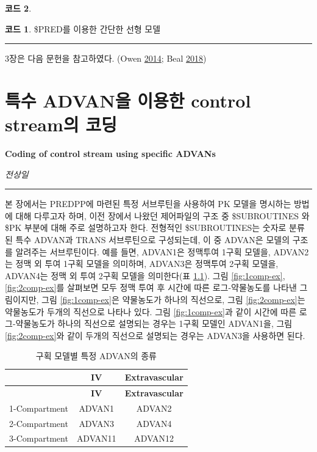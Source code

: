 \documentclass[
  10pt,
  krantz2,
  a4paper]{krantz}
\theoremstyle{definition}
\theoremstyle{definition}
\newtheorem{example}{코드}[chapter]
\theoremstyle{definition}
\theoremstyle{remark}
\begin{document}
\begin{example}
\begin{example}

\protect\hypertarget{exm:linear-model}{}{\label{exm:linear-model} }\$PRED를 이용한 간단한 선형 모델

\end{example}
\end{example}

\begin{center}\rule{0.5\linewidth}{0.5pt}\end{center}

3장은 다음 문헌을 참고하였다. (Owen \protect\hyperlink{ref-kelly}{2014}; Beal \protect\hyperlink{ref-nonmem}{2018})

\hypertarget{specific-advan}{%
\chapter{특수 ADVAN을 이용한 control stream의 코딩}\label{specific-advan}}

\textbf{Coding of control stream using specific ADVANs}

\emph{전상일}

\begin{center}\rule{0.5\linewidth}{0.5pt}\end{center}

본 장에서는 PREDPP에 마련된 특정 서브루틴을 사용하여 PK 모델을 명시하는 방법에 대해 다루고자 하며, 이전 장에서 나왔던 제어파일의 구조 중 \$SUBROUTINES 와 \$PK 부분에 대해 주로 설명하고자 한다. 전형적인 \$SUBROUTINES는 숫자로 분류된 특수 ADVAN과 TRANS 서브루틴으로 구성되는데, 이 중 ADVAN은 모델의 구조를 알려주는 서브루틴이다. 예를 들면, ADVAN1은 정맥투여 1구획 모델을, ADVAN2는 정맥 외 투여 1구획 모델을 의미하며, ADVAN3은 정맥투여 2구획 모델을, ADVAN4는 정맥 외 투여 2구획 모델을 의미한다(표 \ref{tab:specific-advan}). 그림 \ref{fig:1comp-ex}, \ref{fig:2comp-ex}를 살펴보면 모두 정맥 투여 후 시간에 따른 로그-약물농도를 나타낸 그림이지만, 그림 \ref{fig:1comp-ex}은 약물농도가 하나의 직선으로, 그림 \ref{fig:2comp-ex}는 약물농도가 두개의 직선으로 나타나 있다. 그림 \ref{fig:1comp-ex}과 같이 시간에 따른 로그-약물농도가 하나의 직선으로 설명되는 경우는 1구획 모델인 ADVAN1을, 그림 \ref{fig:2comp-ex}와 같이 두개의 직선으로 설명되는 경우는 ADVAN3을 사용하면 된다.

\begin{longtable}[]{@{}ccc@{}}
\caption{\label{tab:specific-advan} 구획 모델별 특정 ADVAN의 종류}\tabularnewline
\toprule
& \textbf{IV} & \textbf{Extravascular}\tabularnewline
\midrule
\endfirsthead
\toprule
& \textbf{IV} & \textbf{Extravascular}\tabularnewline
\midrule
\endhead
1-Compartment & ADVAN1 & ADVAN2\tabularnewline
2-Compartment & ADVAN3 & ADVAN4\tabularnewline
3-Compartment & ADVAN11 & ADVAN12\tabularnewline
\bottomrule
\end{longtable}
\end{document}
